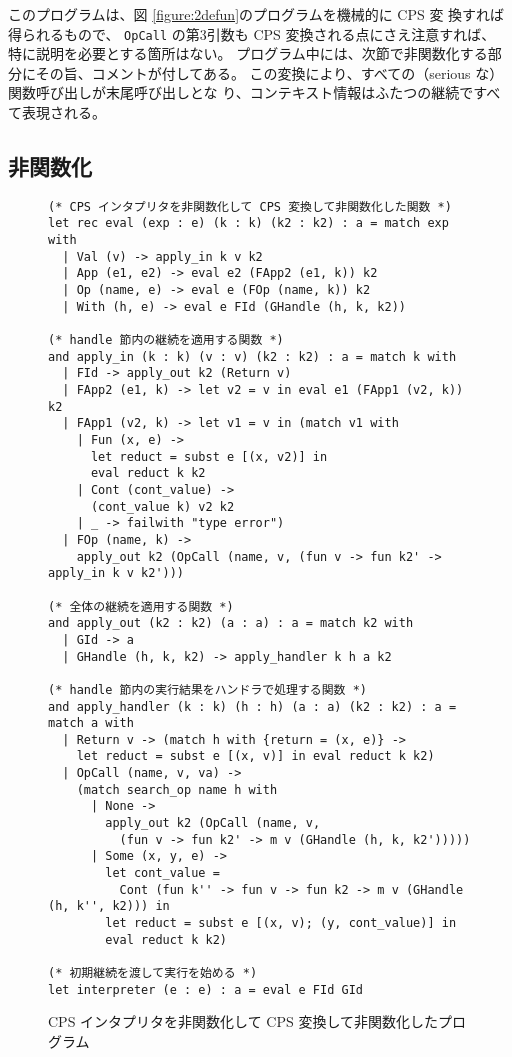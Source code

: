 このプログラムは、図 \ref{figure:2defun}のプログラムを機械的に CPS 変
換すれば得られるもので、
\texttt{OpCall} の第3引数も CPS 変換される点にさえ注意すれば、
特に説明を必要とする箇所はない。
プログラム中には、次節で非関数化する部分にその旨、コメントが付してある。
この変換により、すべての（serious な）関数呼び出しが末尾呼び出しとな
り、コンテキスト情報はふたつの継続ですべて表現される。

\subsection{非関数化}
\label{subsection:4defun}

\begin{figure}
  \begin{spacing}{0.8}
\begin{verbatim}
(* CPS インタプリタを非関数化して CPS 変換して非関数化した関数 *)
let rec eval (exp : e) (k : k) (k2 : k2) : a = match exp with
  | Val (v) -> apply_in k v k2
  | App (e1, e2) -> eval e2 (FApp2 (e1, k)) k2
  | Op (name, e) -> eval e (FOp (name, k)) k2
  | With (h, e) -> eval e FId (GHandle (h, k, k2))

(* handle 節内の継続を適用する関数 *)
and apply_in (k : k) (v : v) (k2 : k2) : a = match k with
  | FId -> apply_out k2 (Return v)
  | FApp2 (e1, k) -> let v2 = v in eval e1 (FApp1 (v2, k)) k2
  | FApp1 (v2, k) -> let v1 = v in (match v1 with
    | Fun (x, e) ->
      let reduct = subst e [(x, v2)] in
      eval reduct k k2
    | Cont (cont_value) ->
      (cont_value k) v2 k2
    | _ -> failwith "type error")
  | FOp (name, k) ->
    apply_out k2 (OpCall (name, v, (fun v -> fun k2' -> apply_in k v k2')))

(* 全体の継続を適用する関数 *)
and apply_out (k2 : k2) (a : a) : a = match k2 with
  | GId -> a
  | GHandle (h, k, k2) -> apply_handler k h a k2

(* handle 節内の実行結果をハンドラで処理する関数 *)
and apply_handler (k : k) (h : h) (a : a) (k2 : k2) : a = match a with
  | Return v -> (match h with {return = (x, e)} ->
    let reduct = subst e [(x, v)] in eval reduct k k2)
  | OpCall (name, v, va) ->
    (match search_op name h with
      | None ->
        apply_out k2 (OpCall (name, v,
          (fun v -> fun k2' -> m v (GHandle (h, k, k2')))))
      | Some (x, y, e) ->
        let cont_value =
          Cont (fun k'' -> fun v -> fun k2 -> m v (GHandle (h, k'', k2))) in
        let reduct = subst e [(x, v); (y, cont_value)] in
        eval reduct k k2)

(* 初期継続を渡して実行を始める *)
let interpreter (e : e) : a = eval e FId GId
\end{verbatim}
\end{spacing}
\caption{CPS インタプリタを非関数化して CPS 変換して非関数化したプログラム}
\label{figure:4defun}
\end{figure}

